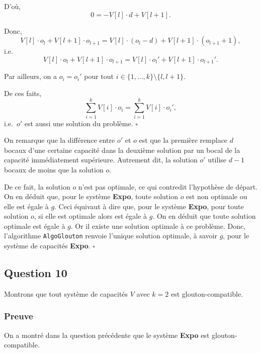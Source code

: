 \documentclass[12pt,a4paper]{article}
\begin{document}
\begin{enumerate}[a)]
 D'o\`u, 
 \begin{equation*}
    0 = -V[l]\cdot d + V[l+1].
 \end{equation*}
 
 Donc, 
 \begin{equation*}
    V[l]\cdot o_l + V[l+1]\cdot o_{l+1} = V[l]\cdot (o_l-d) + V[l+1]\cdot (o_{l+1} + 1),
 \end{equation*}
 i.e.\ 
 \begin{equation*}
    V[l]\cdot o_l + V[l+1]\cdot o_{l+1} = V[l]\cdot o_l' + V[l+1]\cdot o_{l+1}'.
 \end{equation*}
  
  Par ailleurs, on a $o_i = o_i' $ pour tout $i \in \{1, \dotsc, k\}\setminus \{ l,l+1 \}$. 
  
  De ces faits, 
  \begin{equation*}
   \displaystyle\sum_{i=1}^{k} V[i]\cdot o_i = \displaystyle\sum_{i=1}^{k} V[i]\cdot o_i',
  \end{equation*}
  i.e.\ $o'$ est aussi une solution du probl\`eme. \hfill\ensuremath{\square}
  
  \medskip
  On remarque que la diff\'erence entre $o'$ et $o$ est que la premi\`ere remplace $d$ bocaux d'une certaine capacit\'e dans la deuxi\`eme solution par un bocal de la capacit\'e imm\'ediatement sup\'erieure. Autrement dit, la solution $o'$ utilise $d-1$ bocaux de moins que la solution $o$.
  
  De ce fait, la solution $o$ n'est pas optimale, ce qui contredit l'hypoth\`ese de d\'epart. On en d\'eduit que, pour le syst\`eme {\bfseries Expo}, toute solution $o$ est non optimale ou elle est \'egale \`a $g$. Ceci \'equivaut \`a dire que, pour le syst\`eme {\bfseries Expo}, pour toute solution $o$, si elle est optimale alors est \'egale \`a $g$. On en d\'eduit que toute solution optimale est \'egale \`a $g$. Or il existe une solution optimale \`a ce probl\`eme. Donc, l'algorithme \texttt{AlgoGlouton} renvoie l'unique solution optimale, \`a savoir $g$, pour le syst\`eme de capacit\'es {\bfseries Expo}. \hfill\ensuremath{\square}
\end{enumerate}

\subsection*{Question 10}
 Montrons que tout syst\`eme de capacit\'es $V$ avec $k = 2$ est glouton-compatible.

 \subsubsection*{Preuve}
 On a montr\'e dans la question pr\'ec\'edente que le syst\`eme {\bfseries Expo} est glouton-compatible.
\end{document}
